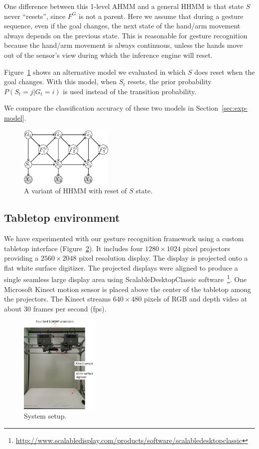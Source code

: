 \documentclass[10pt,twocolumn,letterpaper]{article}
\begin{document}
One difference between this 1-level AHMM and a general HHMM is that state $S$ never
``resets'', since $F^G$ is not a parent. Here we assume that during a gesture sequence, even if the goal changes,
the next state of the hand/arm movement always depends on the previous state. This is reasonable for gesture recognition because the hand/arm 
movement is always continuous, unless the hands move out of the sensor's view during
which the inference engine will reset. 

Figure~\ref{fig:ahmm-reset} shows an alternative model we evaluated in which
 $S$ does reset when the goal changes. With this model, when $S_t$ resets, the prior
probability $P(S_t = j | G_t = i)$ is used instead of the transition probability. 

We compare the classification accuracy of these two models in Section~\ref{sec:exp-model}.

\begin{figure}[tb]
  \centering
  \includegraphics[width=0.4\textwidth]{figure/ahmm-reset.png} 
  \caption{A variant of HHMM with reset of $S$ state.}
  \label{fig:ahmm-reset}
\end{figure}

\subsection{Tabletop environment}
We have experimented with our gesture recognition framework using a custom tabletop 
interface (Figure~\ref{fig:setup}). It includes four $1280\times1024$ pixel 
projectors providing a $2560\times2048$ pixel resolution display. The display is 
projected onto a flat white surface digitizer. The projected displays
were aligned to produce a single seamless large display area using ScalableDesktop\texttrademark Classic software~\footnote{\url{http://www.scalabledisplay.com/products/software/scalabledesktopclassic}}. 
One Microsoft Kinect motion sensor is placed above the center of the
tabletop among the projectors. The Kinect streams $640\times 480$ pixels of
RGB and depth video at about 30 frames per second (fps). 

\begin{figure}[tb]
  \centering
  \includegraphics[width=0.34\textwidth]{figure/setup2.png} 
    \caption{System setup.} \label{fig:setup}
\end{figure}
\end{document}
